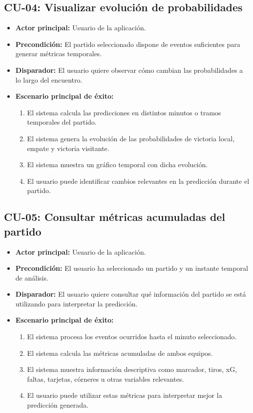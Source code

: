 \subsection*{CU-04: Visualizar evolución de probabilidades}

\begin{itemize}
    \item \textbf{Actor principal:} Usuario de la aplicación.
    \item \textbf{Precondición:} El partido seleccionado dispone de eventos suficientes para generar métricas temporales.
    \item \textbf{Disparador:} El usuario quiere observar cómo cambian las probabilidades a lo largo del encuentro.
    \item \textbf{Escenario principal de éxito:}
          \begin{enumerate}
              \item El sistema calcula las predicciones en distintos minutos o tramos temporales del partido.
              \item El sistema genera la evolución de las probabilidades de victoria local, empate y victoria visitante.
              \item El sistema muestra un gráfico temporal con dicha evolución.
              \item El usuario puede identificar cambios relevantes en la predicción durante el partido.
          \end{enumerate}
\end{itemize}

\subsection*{CU-05: Consultar métricas acumuladas del partido}

\begin{itemize}
    \item \textbf{Actor principal:} Usuario de la aplicación.
    \item \textbf{Precondición:} El usuario ha seleccionado un partido y un instante temporal de análisis.
    \item \textbf{Disparador:} El usuario quiere consultar qué información del partido se está utilizando para interpretar la predicción.
    \item \textbf{Escenario principal de éxito:}
          \begin{enumerate}
              \item El sistema procesa los eventos ocurridos hasta el minuto seleccionado.
              \item El sistema calcula las métricas acumuladas de ambos equipos.
              \item El sistema muestra información descriptiva como marcador, tiros, xG, faltas, tarjetas, córneres u otras variables relevantes.
              \item El usuario puede utilizar estas métricas para interpretar mejor la predicción generada.
          \end{enumerate}
\end{itemize}

